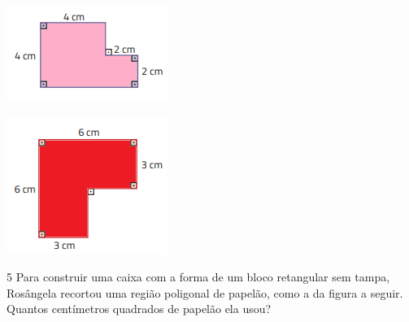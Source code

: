 \begin{escolha}[itemsep=0pt]
\item \includegraphics[width=.5\textwidth]{./imgSAEB_8_MAT/media/image43.png}\\

\item \includegraphics[width=.5\textwidth]{./imgSAEB_8_MAT/media/image44.png}\\
\end{escolha}

\num{5} Para construir uma caixa com a forma de um bloco retangular sem
tampa, Rosângela recortou uma região poligonal de papelão, como a da
figura a seguir. Quantos centímetros quadrados de papelão ela usou?

